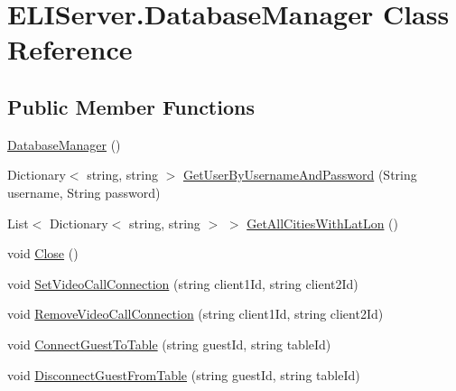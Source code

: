 \hypertarget{class_e_l_i_server_1_1_database_manager}{}\section{E\+L\+I\+Server.\+Database\+Manager Class Reference}
\label{class_e_l_i_server_1_1_database_manager}
\subsection*{Public Member Functions}
\begin{DoxyCompactItemize}
\item 
\hyperlink{class_e_l_i_server_1_1_database_manager_af4932c44cd155cec929be0207f17605e}{Database\+Manager} ()
\item 
Dictionary$<$ string, string $>$ \hyperlink{class_e_l_i_server_1_1_database_manager_a5eaf0569ca067ab6e074fc76c03439fe}{Get\+User\+By\+Username\+And\+Password} (String username, String password)
\item 
List$<$ Dictionary$<$ string, string $>$ $>$ \hyperlink{class_e_l_i_server_1_1_database_manager_a85c00dfc07b07c4840aca4fcdd09175e}{Get\+All\+Cities\+With\+Lat\+Lon} ()
\item 
void \hyperlink{class_e_l_i_server_1_1_database_manager_a7f64bd7fd49cd35e15362d2db5a302e0}{Close} ()
\item 
void \hyperlink{class_e_l_i_server_1_1_database_manager_a27bf3444db3446216c2a0c7b957895d9}{Set\+Video\+Call\+Connection} (string client1\+Id, string client2\+Id)
\item 
void \hyperlink{class_e_l_i_server_1_1_database_manager_a8e8315c9b23095cbe799c8f75ccacc87}{Remove\+Video\+Call\+Connection} (string client1\+Id, string client2\+Id)
\item 
void \hyperlink{class_e_l_i_server_1_1_database_manager_a4167599aa3be67444134c0fd4f837c82}{Connect\+Guest\+To\+Table} (string guest\+Id, string table\+Id)
\item 
void \hyperlink{class_e_l_i_server_1_1_database_manager_a99034ff69cba06942d29a9ad444b04c3}{Disconnect\+Guest\+From\+Table} (string guest\+Id, string table\+Id)
\end{DoxyCompactItemize}
